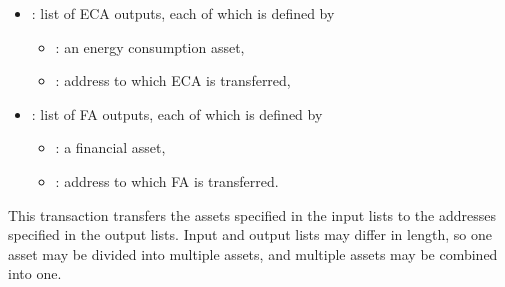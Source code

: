 \begin{itemize}[noitemsep,topsep=-\parskip]
\item {}: list of ECA outputs, each of which is defined by
\begin{itemize}[leftmargin=0.5em,nosep]
\item {}: an energy consumption asset,
\item {}: address to which ECA is transferred,
\end{itemize}
\item {}: list of FA outputs, each of which is defined by
\begin{itemize}[leftmargin=0.5em,nosep]
\item {}: a financial asset,
\item {}: address to which FA is transferred.
\end{itemize}
\end{itemize}
\vspace{0.5\parskip} This transaction transfers the assets specified
in the input lists to the addresses specified in the output lists.
Input and output lists may differ in length, so one asset may be
divided into multiple assets, and multiple assets may be combined into
one.

